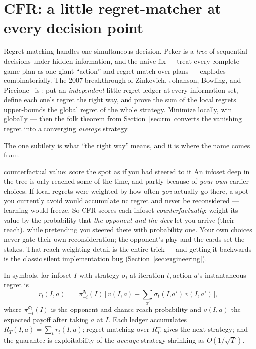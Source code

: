 \section{CFR: a little regret-matcher at every decision point}\label{sec:cfr}

Regret matching handles one simultaneous decision. Poker is a \emph{tree} of sequential decisions under hidden information, and the naive fix --- treat every complete game plan as one giant ``action'' and regret-match over plans --- explodes combinatorially. The 2007 breakthrough of Zinkevich, Johanson, Bowling, and Piccione~\cite{zinkevich2007} is : put an \emph{independent} little regret ledger at every information set, define each one's regret the right way, and prove the sum of the local regrets upper-bounds the global regret of the whole strategy. Minimize locally, win globally --- then the folk theorem from Section~\ref{sec:rm} converts the vanishing regret into a converging \emph{average} strategy.

The one subtlety is what ``the right way'' means, and it is where the name comes from.

\begin{intuition}{counterfactual value: score the spot as if you had steered to it}
An infoset deep in the tree is only reached some of the time, and partly because of \emph{your own} earlier choices. If local regrets were weighted by how often \emph{you} actually go there, a spot you currently avoid would accumulate no regret and never be reconsidered --- learning would freeze. So CFR scores each infoset \emph{counterfactually}: weight its value by the probability that \emph{the opponent and the deck} let you arrive (their reach), while pretending you steered there with probability one. Your own choices never gate their own reconsideration; the opponent's play and the cards set the stakes. That reach-weighting detail is the entire trick --- and getting it backwards is the classic silent implementation bug (Section~\ref{sec:engineering}).
\end{intuition}

In symbols, for infoset $I$ with strategy $\sigma_t$ at iteration $t$, action $a$'s instantaneous regret is
$$ r_t(I,a) \;=\; \pi^{\sigma_t}_{-i}(I)\,\bigl[\,v(I,a) - \textstyle\sum_{a'} \sigma_t(I,a')\,v(I,a')\,\bigr], $$
where $\pi^{\sigma_t}_{-i}(I)$ is the opponent-and-chance reach probability and $v(I,a)$ the expected payoff after taking $a$ at $I$. Each ledger accumulates $R_T(I,a)=\sum_t r_t(I,a)$; regret matching over $R_T^+$ gives the next strategy; and the guarantee is exploitability of the \emph{average} strategy shrinking as $O(1/\sqrt{T})$.

